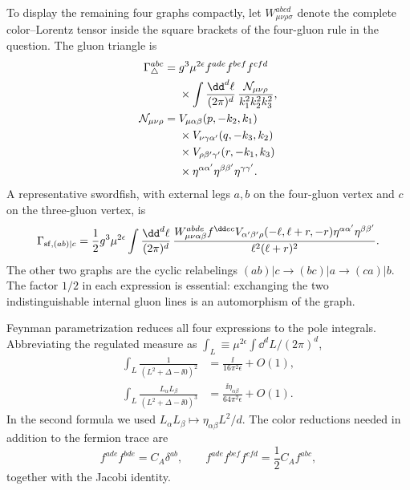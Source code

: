 \begin{enumerate}
  To display the remaining four graphs compactly, let
  \(W_{\mu\nu\rho\sigma}^{abcd}\) denote the complete color--Lorentz tensor
  inside the square brackets of the four-gluon rule in the question.  The
  gluon triangle is
  \[
  \begin{split}
    \Gamma_{\triangle}^{abc}
     ={}&g^3\mu^{2\epsilon}
       f^{ade}f^{bef}f^{cfd}\\
      &{}\times\int\frac{\dd^d\ell}{(2\pi)^d}\,
       \frac{{\cal N}_{\mu\nu\rho}}{k_1^2k_2^2k_3^2},\\
    {\cal N}_{\mu\nu\rho}={}&
       V_{\mu\alpha\beta}(p,-k_2,k_1)\\
      &{}\times V_{\nu\gamma\alpha'}(q,-k_3,k_2)\\
      &{}\times V_{\rho\beta'\gamma'}(r,-k_1,k_3)\\
      &{}\times\eta^{\alpha\alpha'}\eta^{\beta\beta'}
       \eta^{\gamma\gamma'}.
  \end{split}
  \]
  A representative swordfish, with external legs \(a,b\) on the
  four-gluon vertex and \(c\) on the three-gluon vertex, is
  \[
    \Gamma_{{\rm sf},(ab)|c}
      =\frac12g^3\mu^{2\epsilon}
       \int\frac{\dd^d\ell}{(2\pi)^d}\,
       \frac{
         W_{\mu\nu\alpha\beta}^{abde}
         f^{\dd ec}V_{\alpha'\beta'\rho}
            (-\ell,\ell+r,-r)
         \eta^{\alpha\alpha'}\eta^{\beta\beta'}}
       {\ell^2(\ell+r)^2}.
  \]
  The other two graphs are the cyclic relabelings
  \((ab)|c\to(bc)|a\to(ca)|b\).  The factor \(1/2\) in each expression is
  essential: exchanging the two indistinguishable internal gluon lines is
  an automorphism of the graph.

  Feynman parametrization reduces all four expressions to the pole
  integrals.  Abbreviating the regulated measure as
  \(\int_L\equiv\mu^{2\epsilon}\int \dd^dL/(2\pi)^d\),
  \[
  \begin{aligned}
    \int_L\frac1{(L^2+\Delta-\ii0)^2}
       &=\frac{\ii}{16\pi^2\epsilon}+O(1),\\
    \int_L\frac{L_\alpha L_\beta}{(L^2+\Delta-\ii0)^3}
       &=\frac{\ii\eta_{\alpha\beta}}{64\pi^2\epsilon}+O(1).
  \end{aligned}
  \]
  In the second formula we used
  \(L_\alpha L_\beta\mapsto\eta_{\alpha\beta}L^2/d\).
  The color reductions needed in addition to the fermion trace are
  \[
    f^{ade}f^{bde}=C_A\delta^{ab},\qquad
    f^{ade}f^{bef}f^{cfd}=\frac12C_Af^{abc},
  \]
  together with the Jacobi identity.


\end{enumerate}
